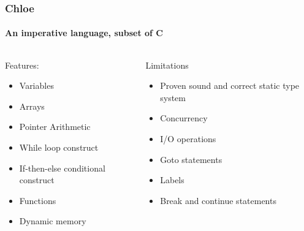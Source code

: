 \begin{frame}
\frametitle{Chloe}
\framesubtitle{An imperative language, subset of C}

\begin{columns}[t]
\begin{block}{Features:}
\pause
\begin{itemize}
\item{Variables}
\pause
\item{Arrays}
\pause
\item{Pointer Arithmetic}
\pause
\item{While loop construct}
\pause
\item{If-then-else conditional construct}
\pause
\item{Functions}
\pause
\item{Dynamic memory}
\pause
\end{itemize}
\end{block}
\begin{block}{Limitations}
\begin{itemize}
\pause
\item{Proven sound and correct static type system}
\pause
\item{Concurrency}
\pause
\item{I/O operations}
\pause
\item{Goto statements}
\pause
\item{Labels}
\pause
\item{Break and continue statements}
\end{itemize}
\pause
\end{block}
\end{columns}

\end{frame}

